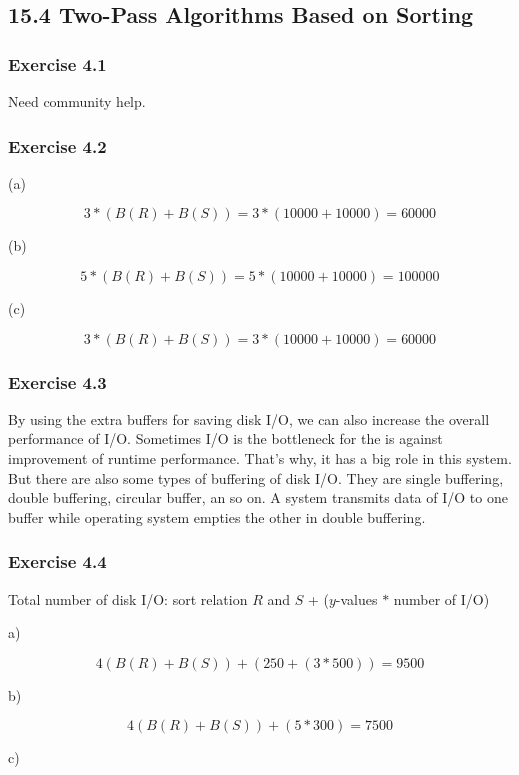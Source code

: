 \documentclass[../../main.tex]{subfiles}
\begin{document}
\subsection{15.4 Two-Pass Algorithms Based on Sorting}

\subsubsection*{Exercise 4.1}

Need community help.

\subsubsection*{Exercise 4.2}

(a)

$$
3 * (B(R) + B(S)) = 3 * (10000 + 10000) = 60000
$$


(b)

$$
5 * (B(R) + B(S)) = 5 * (10000 + 10000) = 100000
$$

(c)

$$
3 * (B(R) + B(S)) = 3 * (10000 + 10000) = 60000
$$

\subsubsection*{Exercise 4.3}

By using the extra buffers for saving disk I/O, we can also increase the
overall performance of I/O. Sometimes I/O is the bottleneck for the is
against improvement of runtime performance. That's why, it has a big role
in this system. But there are also some types of buffering of disk I/O. They
are single buffering, double buffering, circular buffer, an so on. A system
transmits data of I/O to one buffer while operating system empties the
other in double buffering.

\subsubsection*{Exercise 4.4}

Total number of disk I/O: sort relation $R$ and $S$ + ($y$-values $*$ number of
I/O)

a)

$$
4 (B(R)+B(S)) + (250 + (3 * 500)) = 9500
$$

b)

$$
4 (B(R)+B(S)) + (5 * 300) = 7500
$$

c)
\end{document}
